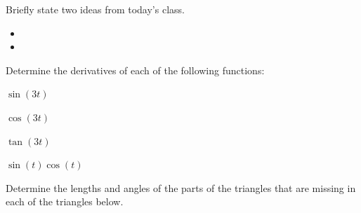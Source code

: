 \postClass

\begin{problem}
\item Briefly state two ideas from today's class.
  \begin{itemize}
  \item
  \item
  \end{itemize}
\item
  \begin{subproblem}
    \item
  \end{subproblem}
\end{problem}


\begin{problem}
\item Determine the derivatives of each of the following functions:
  \begin{subproblem}
  \item $\sin(3t)$
    \vfill
  \item $\cos(3t)$
    \vfill
  \item $\tan(3t)$
    \vfill
  \item $\sin(t)\cos(t)$
    \vfill
  \end{subproblem}

  \clearpage

\item Determine the lengths and angles of the parts of the triangles
  that are missing in each of the triangles below.

  \scalebox{0.5}{}

  \vfill

\end{problem}

